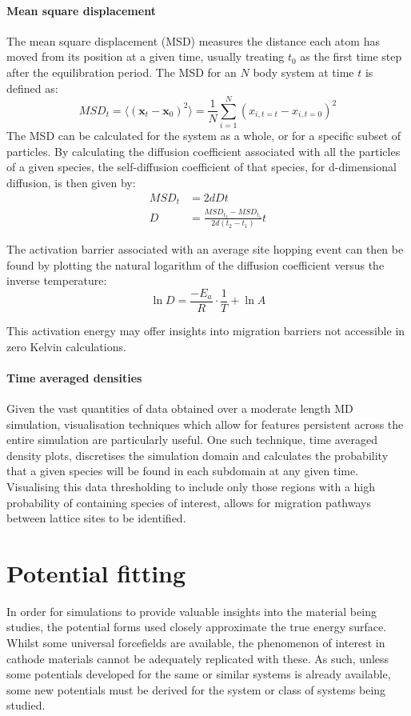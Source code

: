 \paragraph{Mean square displacement}
The mean square displacement (MSD) measures the distance each atom has moved from its position at a given time, usually treating $t_0$ as the first time step after the equilibration period.
The MSD for an $N$ body system at time $t$ is defined as:
\begin{equation}
	MSD_t = \langle (\mathbf{x}_t - \mathbf{x}_0)^2 \rangle = \frac{1}{N}\sum_{i=1}^N(x_{i, t = t} - x_{i, t = 0})^2
\end{equation}
The MSD can be calculated for the system as a whole, or for a specific subset of particles.
By calculating the diffusion coefficient associated with all the particles of a given species, the self-diffusion coefficient of that species, for d-dimensional diffusion, is then given by:
\begin{align}
	MSD_t &= 2dDt\\[5pt]
	D &= \frac{MSD_{t_2} - MSD_{t_1}}{2d(t_2 - t_1)}t
\end{align}

The activation barrier associated with an average site hopping event can then be found by plotting the natural logarithm of the diffusion coefficient versus the inverse temperature:
\begin{equation}
	\ln{D} = \frac{-E_a}{R}\cdot\frac{1}{T} + \ln{A}
\end{equation}

This activation energy may offer insights into migration barriers not accessible in zero Kelvin calculations.
\paragraph{Time averaged densities}
Given the vast quantities of data obtained over a moderate length MD simulation, visualisation techniques which allow for features persistent across the entire simulation are particularly useful.
One such technique, time averaged density plots, discretises the simulation domain and calculates the probability that a given species will be found in each subdomain at any given time.
Visualising this data thresholding to include only those regions with a high probability of containing species of interest, allows for migration pathways between lattice sites to be identified.
\section{Potential fitting}
In order for simulations to provide valuable insights into the material being studies, the potential forms used closely approximate the true energy surface.
Whilst some universal forcefields are available, the phenomenon of interest in cathode materials cannot be adequately replicated with these.
As such, unless some potentials developed for the same or similar systems is already available, some new potentials must be derived for the system or class of systems being studied.

